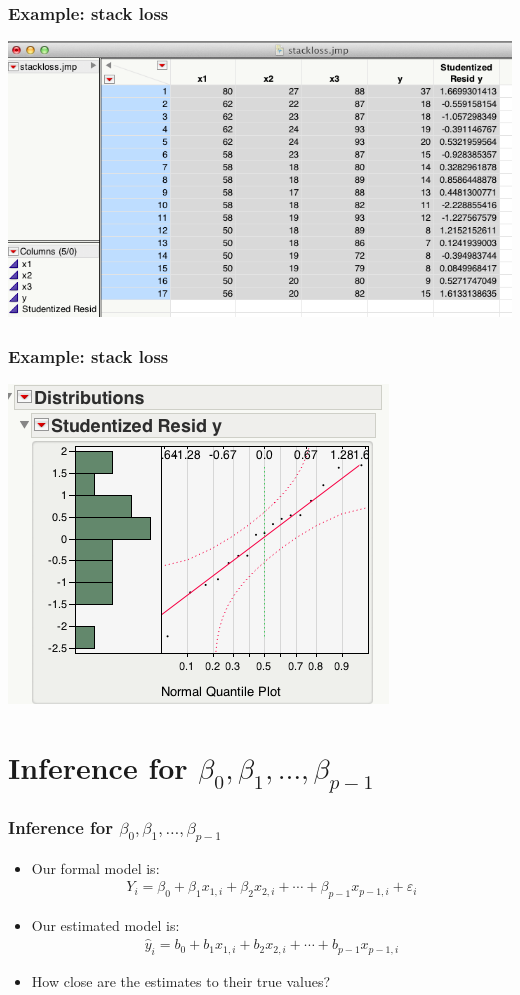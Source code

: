 \documentclass[handout]{beamer}\usepackage{graphicx, color}
\providecommand{\e}{\varepsilon}
\providecommand{\wh}[1]{\widehat{#1}}
\numberwithin{equation}{section}
\begin{document}
\begin{frame}
\frametitle{Example: stack loss}
 \includegraphics{../../fig/stackstd2.png}
\end{frame}


\begin{frame}
\frametitle{Example: stack loss}
 \includegraphics{../../fig/stackstd3.png}
\end{frame}




\section{Inference for $\beta_0, \beta_1, \ldots, \beta_{p-1}$}

\begin{frame}
\frametitle{Inference for $\beta_0, \beta_1, \ldots, \beta_{p-1}$}
\begin{itemize}
\item Our formal model is:
\begin{align*}
Y_i = \beta_0 + \beta_1 x_{1, i} + \beta_2 x_{2, i} + \cdots + \beta_{p-1} x_{p-1, i} + \e_i
\end{align*}
\pause \item Our estimated model is:
\begin{align*}
\wh{y}_i = b_0 +b_1 x_{1, i} +b_2 x_{2, i} + \cdots + b_{p-1} x_{p-1, i} 
\end{align*}
\pause \item How close are the estimates to their true values?
\end{itemize}
\end{frame}
\end{document}
